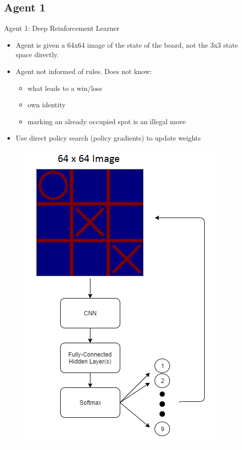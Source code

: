 \documentclass[11pt]{beamer}
\begin{document}
\subsection{Agent 1}
\begin{frame}{Agent 1: Deep Reinforcement Learner}
	\begin{minipage}[t]{0.45\linewidth}
		\begin{itemize}
			\item Agent is given a 64x64 image of the state of the board, not the 3x3 state space directly.
			\item Agent not informed of rules. Does not know:
				\begin{itemize}
					\item what leads to a win/loss
					\item own identity
					\item marking an already occupied spot is an illegal move
				\end{itemize}
			\item Use direct policy search (policy gradients) to update weights
		\end{itemize}
	\end{minipage}%
	\hfill
	\begin{minipage}[t]{0.45\linewidth}
		\centering
		\begin{figure}[tttDL]
			\centering
			\includegraphics[width=.95\textwidth]{Figures/deeptictactoe.png}

\end{figure}
\end{minipage}
\end{frame}
\end{document}
